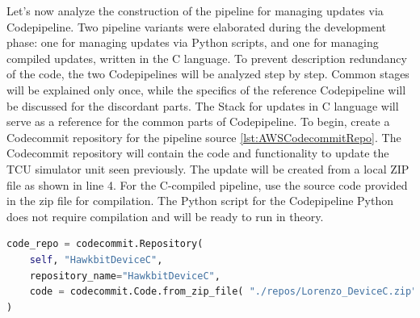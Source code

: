 Let's now analyze the construction of the pipeline for managing updates via Codepipeline. Two pipeline variants were elaborated during the development phase: one for managing updates via Python scripts, and one for managing compiled updates, written in the C language. To prevent description redundancy of the code, the two Codepipelines will be analyzed step by step. Common stages will be explained only once, while the specifics of the reference Codepipeline will be discussed for the discordant parts. The Stack for updates in C language will serve as a reference for the common parts of Codepipeline.
To begin, create a Codecommit repository for the pipeline source \ref{lst:AWSCodecommitRepo}. The Codecommit repository will contain the code and functionality to update the TCU simulator unit seen previously. The update will be created from a local ZIP file as shown in line 4. For the C-compiled pipeline, use the source code provided in the zip file for compilation. The Python script for the Codepipeline Python does not require compilation and will be ready to run in theory.
\begin{lstlisting}[language=Python, caption={CDK Code for the creation of the TCU simulator Codecommit repository}, label=lst:AWSCodecommitRepo]
code_repo = codecommit.Repository(
    self, "HawkbitDeviceC",
    repository_name="HawkbitDeviceC",
    code = codecommit.Code.from_zip_file( "./repos/Lorenzo_DeviceC.zip", "master" ) # Copies files from app directory to the repo as the initial commit
)
\end{lstlisting}


